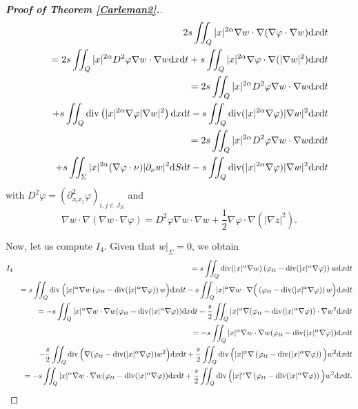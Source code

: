 \documentclass[11pt]{article}
\numberwithin{equation}{section}
\def\pt{\partial}
\def\vp{\varphi}
\def\bf{\textbf}
\def\pt{\partial}
\def\al{\alpha}
\def\f{\frac}
\def\df{\mathrm d}
\DeclareMathOperator{\Div}{div}
\begin{document}
\begin{proof}[{\rm \bf { Proof of  Theorem \ref{Carleman2}.}}]
\begin{eqnarray*}
				&&2s\iint_Q|x|^{2\al}\nabla w\cdot \nabla(\nabla \vp\cdot \nabla w)\df x\df t\\
				&&=2s\iint_Q|x|^{2\al}D^2\vp\nabla w\cdot \nabla w\df x\df t+s\iint_Q|x|^{2\al}\nabla \vp\cdot \nabla (|\nabla w|^2)\df x\df t\\
				&&=2s\iint_Q|x|^{2\al}D^2\vp\nabla w\cdot \nabla w\df x\df t\\
				&&\hspace{4.5mm}+s\iint_Q\Div\left( |x|^{2\al}\nabla \vp |\nabla w|^2\right)\df x\df t-s\iint_Q\Div(|x|^{2\al}\nabla\vp)|\nabla w|^2\df x\df t\\
				&&=2s\iint_Q|x|^{2\al}D^2\vp\nabla w\cdot \nabla w\df x\df t\\
				&&\hspace{4.5mm}+s\iint_\Sigma  |x|^{2\al}(\nabla \vp\cdot\nu) |\pt_\nu w|^2 \df S\df t-s\iint_Q\Div(|x|^{2\al}\nabla\vp)|\nabla w|^2\df x\df t\\
			\end{eqnarray*}
			with $D^2\vp=(\pt_{x_ix_j}^2\vp)_{i,j\in J_N}$ and
			\begin{equation*}
				\nabla w\cdot \nabla (\nabla w\cdot \nabla \vp)=D^2\vp\nabla w\cdot \nabla w+\f{1}{2}\nabla \vp\cdot \nabla (|\nabla z|^2).
			\end{equation*}
			
			
			
			Now, let us compute  $I_4$. Given that  $w|_{\Sigma}=0$, we obtain
			\begin{eqnarray*}
				I_4
				&&=s\iint_Q\Div(|x|^\al \nabla w)\left(\vp_{tt}-\Div (|x|^\al \nabla \vp)\right)w\df x\df t\\
				&&=s\iint_Q\Div\Big(|x|^\al \nabla w\left(\vp_{tt}-\Div (|x|^\al \nabla \vp)\right)w\Big)\df x\df t-s\iint_Q|x|^\al \nabla w\cdot \nabla \Big( \left(\vp_{tt}-\Div (|x|^\al \nabla \vp)\right)w\Big)\df x\df t\\
				&&=-s\iint_Q|x|^\al \nabla w\cdot \nabla w(\vp_{tt}-\Div(|x|^\al \nabla \vp))\df x\df t-\f{s}{2}\iint_Q|x|^\al  \nabla (\vp_{tt}-\Div (|x|^\al \nabla\vp))\cdot \nabla w^2\df x\df t\\
				&&=-s\iint_Q|x|^\al \nabla w\cdot \nabla w(\vp_{tt}-\Div(|x|^\al \nabla \vp))\df x\df t\\
				&&\hspace{4.5mm}-\f{s}{2}\iint_Q\Div\Big(  \nabla (\vp_{tt}-\Div (|x|^\al \nabla\vp))w^2\Big)\df x\df t+\f{s}{2}\iint_Q\Div\Big(|x|^\al \nabla  \left(\vp_{tt}-\Div (|x|^\al \nabla \vp)\right) \Big) w^2\df x\df t\\
				&&=-s\iint_Q|x|^\al \nabla w\cdot \nabla w(\vp_{tt}-\Div(|x|^\al \nabla \vp))\df x\df t+\f{s}{2}\iint_Q\Div\Big(|x|^\al \nabla  \left(\vp_{tt}-\Div (|x|^\al \nabla \vp)\right) \Big) w^2\df x\df t.
			\end{eqnarray*}
			

\end{proof}
\end{document}
